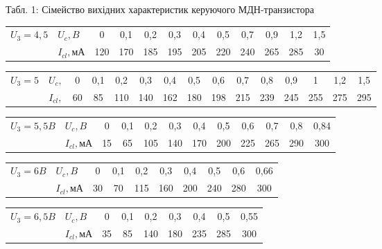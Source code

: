 \documentclass[a4paper,14pt]{extreport}
\begin{document}
Табл. 1: Сімейство вихідних характеристик керуючого МДН-транзистора\\

\begin{tabular}{|l|l|c|c|c|c|c|c|c|c|c|c|}
\hline  {$U_{3}=4,5$} & $U_{c}, B$ & 0 & 0,1 & 0,2 & 0,3 & 0,4 & 0,5 & 0,7 & 0,9 & 1,2 & 1,5 \\
\cline { 2 - 12 } & $I_{c l}, \text{мА}$ & 120 & 170 & 185 & 195 & 205 & 220 & 240 & 265 & 285 & 30\\
\hline
\end{tabular}
\vspace{1cm}

\begin{tabular}{|c|c|c|c|c|c|c|c|c|c|c|c|c|c|c|}
\hline$U_{3}=5$ & $U_{c},$ & 0 & 0,1 & 0,2 & 0,3 & 0,4 & 0,5 & 0,6 & 0,7 & 0,8 & 0,9 & 1 & 1,2 & 1,5 \\
\cline { 2 - 15 }& $I_{c l},$ & 60 & 85 & 110 & 140 & 162 & 180 & 198 & 215 & 239 & 245 & 255 & 275 & 295\\
\hline
\end{tabular}
\vspace{1cm}

\begin{tabular}{|l|l|c|c|c|c|c|c|c|c|c|c|}
\hline  {$U_{3}=5,5 B$} & $U_{c}, B$ & 0 & 0,1 & 0,2 & 0,3 & 0,4 & 0,5 & 0,6 & 0,7 & 0,8 & 0,84 \\
\cline { 2 - 12 } & $I_{c l}, \text{мА}$ & 15 & 65 & 105 & 140 & 170 & 200 & 225 & 265 & 290 & 300 \\
\hline
\end{tabular}
\vspace{1cm}

\begin{tabular}{|c|l|c|c|c|c|c|c|c|c|}
\hline  {$U_{3}=6 B$} & $U_{c}, B$ & 0 & 0,1 & 0,2 & 0,3 & 0,4 & 0,5 & 0,6 & 0,66 \\
\cline { 2 - 10 } & $I_{c l}, \text{мА}$ & 30 & 70 & 115 & 160 & 200 & 240 & 280 & 300 \\
\hline
\end{tabular}
\vspace{1cm}

\begin{tabular}{|l|l|c|c|c|c|c|c|c|}
\hline  {$U_{3}=6,5 B$} & $U_{c}, B$ & 0 & 0,1 & 0,2 & 0,3 & 0,4 & 0,5 & 0,55 \\
\cline { 2 - 9 } & $I_{c l}, \text{мА}$ & 35 & 85 & 140 & 180 & 235 & 285 & 300\\
\hline
\end{tabular}
\vspace{1cm}
\end{document}
